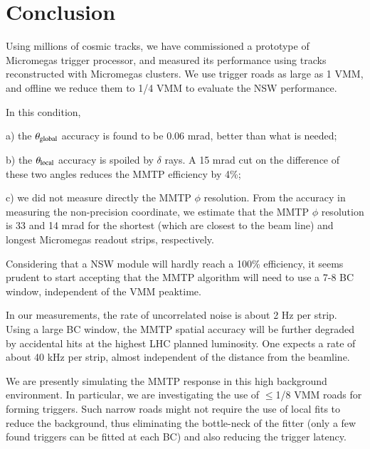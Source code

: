 \section{Conclusion}
\label{sec:conclusions}
 Using millions of cosmic tracks, we have commissioned a prototype of Micromegas trigger processor,
 and measured its performance using tracks reconstructed with Micromegas clusters.
 We use trigger roads as large as  1 VMM, and offline we reduce them to 1/4 VMM to evaluate
 the NSW performance.

 In this condition, 

 a) the $\theta_{\rm global}$ accuracy is found to be 0.06 mrad,  better than what is needed;

 b) the $\theta_{\rm local}$ accuracy is spoiled by $\delta$ rays. A 15 mrad cut on the difference of these two angles
 reduces the MMTP efficiency by 4\%;

 c) we did not measure directly the MMTP $\phi$ resolution. From the accuracy in measuring
 the non-precision coordinate, we estimate that the MMTP $\phi$ resolution  is 33 and 14 mrad for the shortest (which are closest to the beam line) and longest  Micromegas readout strips, respectively. 

 Considering that a NSW module will hardly reach a 100\% efficiency, it seems prudent
 to start accepting that the MMTP algorithm will need to use a 7-8 BC window, independent of the
 VMM  peaktime.

 In our measurements, the rate of uncorrelated noise is about 2  Hz per strip.
 Using a large BC window, the MMTP spatial accuracy will be further degraded by accidental hits at the highest LHC planned
 luminosity.   One expects a rate of
 about 40 kHz per strip, almost independent of the distance from the beamline.

 We are presently simulating the MMTP response in this high background environment.
 In particular, we are investigating the use of $\leq$1/8 VMM  roads for forming triggers.
 Such narrow roads might not require the use of local fits to reduce the background, thus eliminating the bottle-neck of 
the fitter (only a few found triggers can be fitted at each BC) and also  reducing the trigger latency.


